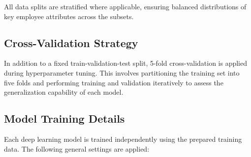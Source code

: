 All data splits are stratified where applicable, ensuring balanced distributions of key employee attributes across the subsets.

\subsection{Cross-Validation Strategy}
In addition to a fixed train-validation-test split, 5-fold cross-validation is applied during hyperparameter tuning. This involves partitioning the training set into five folds and performing training and validation iteratively to assess the generalization capability of each model.

\subsection{Model Training Details}
Each deep learning model is trained independently using the prepared training data. The following general settings are applied:
